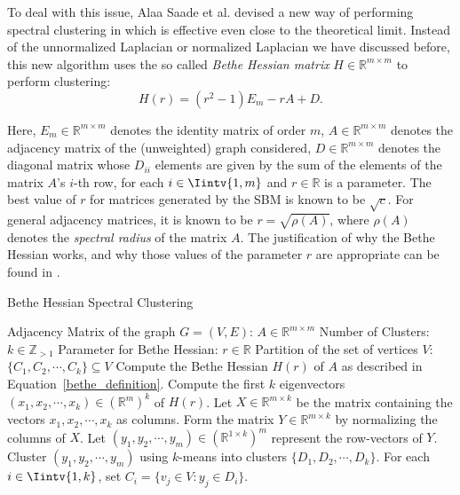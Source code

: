 To deal with this issue, Alaa Saade et al. devised a new way of performing spectral clustering in \cite{Bethe} which is effective even close to the theoretical limit. 
Instead of the unnormalized Laplacian or normalized Laplacian we have discussed before, this new algorithm uses the so called \textit{Bethe Hessian matrix} $H \in \mathbb R ^{m \times m}$ to perform clustering:
\begin{equation}\label{bethe_definition}
   H(r) = (r^2 - 1) E_m -r A + D.
\end{equation}

Here, $E_m \in \mathbb R^{m \times m}$ denotes the identity matrix of order $m$, $A \in \mathbb R^{m \times m}$ denotes the adjacency matrix of the (unweighted) graph considered, $D \in \mathbb R^{m \times m}$ denotes the diagonal matrix whose $D_{ii}$ elements are given by the sum of the elements of the matrix $A$'s $i$-th row, for each $i \in \Iintv{1,m}$ and $r \in \mathbb R$ is a parameter.
The best value of $r$ for matrices generated by the SBM is known to be $\sqrt{c}$.
For general adjacency matrices, it is known to be $r = \sqrt{\rho {(A)}}$, where $\rho (A)$ denotes the \textit{spectral radius} of the matrix $A$.
The justification of why the Bethe Hessian works, and why those values of the parameter $r$ are appropriate can be found in \cite{Bethe}.

\begin{algorithm}
\caption{Bethe Hessian Spectral Clustering}\label{bethe_clustering}
\begin{algorithmic}[1]
   \Require 
      \Statex Adjacency Matrix of the graph $G = (V,E)$: $A \in \mathbb R ^ {m \times m}$ 
      \Statex Number of Clusters: $k \in \mathbb Z_{>1}$
      \Statex Parameter for Bethe Hessian: $r \in \mathbb R$
   \Ensure 
      \Statex Partition of the set of vertices $V$: $\{ C_1, C_2, \cdots, C_k \} \subseteq V$
      \vspace{0.2 cm}
   \State Compute the Bethe Hessian $H(r)$ of $A$ as described in Equation~\vref{bethe_definition}.
   \State Compute the first $k$ eigenvectors $(x_1, x_2, \cdots, x_k) \in (\mathbb R^{m})^k$ of $H(r)$.
   \State Let $X \in \mathbb R^{m \times k}$ be the matrix containing the vectors $x_1, x_2, \cdots, x_k$ as columns.
   \State Form the matrix $Y \in \mathbb R^{m \times k}$ by normalizing the columns of $X$.
   \State Let $(y_1, y_2, \cdots, y_m) \in ( \mathbb R^{1 \times k} )^m$ represent the row-vectors of $Y$.
   \State Cluster $(y_1, y_2, \cdots, y_m)$ using $k$-means into clusters $\{ D_1, D_2, \cdots, D_k \} $.
   \State For each $i \in \Iintv{1,k}$, set $C_i = \{ v_j \in V: y_j \in D_i \}$.
\end{algorithmic}
\end{algorithm}


